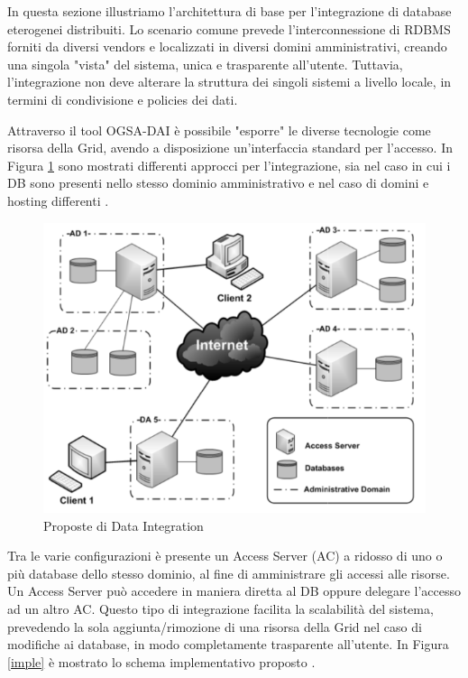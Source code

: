 \documentclass[11pt]{article}
\begin{document}
In questa sezione illustriamo l'architettura di base per l'integrazione di database eterogenei distribuiti. Lo scenario comune prevede l'interconnessione di RDBMS forniti da diversi vendors e localizzati in diversi domini amministrativi, creando una singola "vista" del sistema, unica e trasparente all'utente. Tuttavia, l'integrazione non deve alterare la struttura dei singoli sistemi a livello locale, in termini di condivisione e policies dei dati.

Attraverso il tool OGSA-DAI è possibile "esporre" le diverse tecnologie come risorsa della Grid, avendo a disposizione un'interfaccia standard per l'accesso. In Figura \ref*{propintegr} sono mostrati differenti approcci per l'integrazione, sia nel caso in cui i DB sono presenti nello stesso dominio amministrativo e nel caso di domini e hosting differenti \cite{archgrid}.

\begin{figure}[H]
\centering
\includegraphics[scale=0.50]{images/datainteg.png}
\caption{Proposte di Data Integration \cite{archgrid}}
\label{propintegr}
\end{figure}

Tra le varie configurazioni è presente un Access Server (AC) a ridosso di uno o più database dello stesso dominio, al fine di amministrare gli accessi alle risorse. Un Access Server può accedere in maniera diretta al DB oppure delegare l'accesso ad un altro AC. Questo tipo di integrazione facilita la scalabilità del sistema, prevedendo la sola aggiunta/rimozione di una risorsa della Grid nel caso di modifiche ai database, in modo completamente trasparente all'utente. In Figura \ref{imple} è mostrato lo schema implementativo proposto \cite{archgrid}. 
\end{document}
